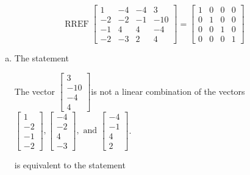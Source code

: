 \begin{exerciseAnswer} 
\[\operatorname{RREF}  \left[\begin{array}{ccc|c}
1 & -4 & -4 & 3 \\
-2 & -2 & -1 & -10 \\
-1 & 4 & 4 & -4 \\
-2 & -3 & 2 & 4
\end{array}\right] = \left[\begin{array}{ccc|c}
1 & 0 & 0 & 0 \\
0 & 1 & 0 & 0 \\
0 & 0 & 1 & 0 \\
0 & 0 & 0 & 1
\end{array}\right] \]
\begin{enumerate}[(a)]
\item  The statement 
\begin{center}\begin{minipage}{0.8\textwidth}
 The vector \( \left[\begin{array}{c}
3 \\
-10 \\
-4 \\
4
\end{array}\right] \)is not a linear combination of the vectors \( \left[\begin{array}{c}
1 \\
-2 \\
-1 \\
-2
\end{array}\right] , \left[\begin{array}{c}
-4 \\
-2 \\
4 \\
-3
\end{array}\right] , \text{ and } \left[\begin{array}{c}
-4 \\
-1 \\
4 \\
2
\end{array}\right] \). 
\end{minipage}\end{center}
     is equivalent to the statement 
\begin{center}\begin{minipage}{0.8\textwidth}
 The vector equation \( x_{1} \left[\begin{array}{c}
1 \\
-2 \\
-1 \\

\end{array}
\end{minipage}
\end{center}
\end{enumerate}
\end{exerciseAnswer}
